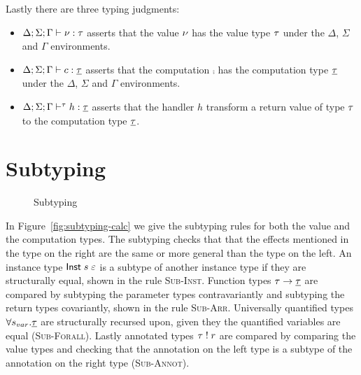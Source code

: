 {Lastly there are three typing judgments:
\begin{itemize}
\setlength\itemsep{0.5em}
\item $\Delta;\Sigma;\Gamma \vdash \nu : \tau$ asserts that the value $\nu$ has the value type $\tau$ under the $\Delta$, $\Sigma$ and $\Gamma$ environments.
\item $\Delta;\Sigma;\Gamma \vdash c : \underline{\tau}$ asserts that the computation $\comp$ has the computation type $\underline{\tau}$ under the $\Delta$, $\Sigma$ and $\Gamma$ environments.
\item $\Delta;\Sigma;\Gamma \vdash^{\tau} h : \underline{\tau}$ asserts that the handler $h$ transform a return value of type $\tau$ to the computation type $\underline{\tau}$.
\end{itemize}

\section{Subtyping}
\label{sec:subtyping}
\begin{figure}[h]
\caption{Subtyping}
\centering
{}
\end{figure}

In Figure~\ref{fig:subtyping-calc} we give the subtyping rules for both the value and the computation types.
The subtyping checks that that the effects mentioned in the type on the right are the same or more general than the type on the left.
An instance type $\mathsf{Inst} \; s \; \varepsilon$ is a subtype of another instance type if they are structurally equal, shown in the rule \textsc{Sub-Inst}.
Function types $\tau \rightarrow \underline{\tau}$ are compared by subtyping the parameter types contravariantly and subtyping the return types covariantly, shown in the rule \textsc{Sub-Arr}.
Universally quantified types $\forall s_{var} . \underline{\tau}$ are structurally recursed upon, given they the quantified variables are equal (\textsc{Sub-Forall}).
Lastly annotated types $\tau \; ! \; r$ are compared by comparing the value types and checking that the annotation on the left type is a subtype of the annotation on the right type (\textsc{Sub-Annot}).

}
